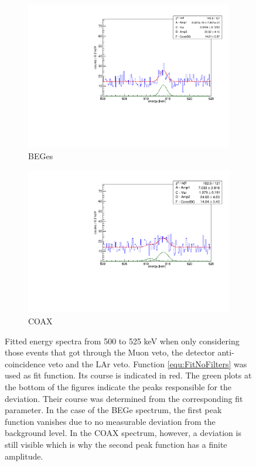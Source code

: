 \documentclass[encoding=utf8,british]{tumphthesis}
\begin{document}
\begin{figure}[t!]
	\centering
	\begin{subfigure}{.5\textwidth}
		\centering
		\includegraphics[width=\textwidth]{./Bilder/500525FitLArVetoBEGes.pdf}
		\caption{BEGes}
		\label{fig:FitLArVetoBEGes}
	\end{subfigure}\hfill%
	\begin{subfigure}{.5\textwidth}
		\centering
		\includegraphics[width=\textwidth]{./Bilder/500525FitLArVetoCOAX.pdf}
		\caption{COAX}
		\label{fig:FitLArVetoCOAX}
	\end{subfigure}
	\caption{
	Fitted energy spectra from 500 to 525 keV when only considering those events that got through the Muon veto, the detector anti-coincidence veto and the LAr veto. 
	Function \ref{equ:FitNoFilters} was used as fit function. 
	Its course is indicated in red. 
	The green plots at the bottom of the figures indicate the peaks responsible for the deviation. 
	Their course was determined from the corresponding fit parameter.
    In the case of the BEGe spectrum, the first peak function vanishes due to no measurable deviation from the background level.
    In the COAX spectrum, however, a deviation is still visible which is why the second peak function has a finite amplitude.
	}
\end{figure}
\end{document}
